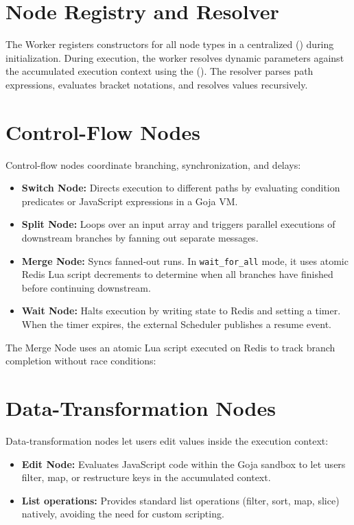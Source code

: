 \documentclass[12pt]{report}
\begin{document}
\section{Node Registry and Resolver}
The Worker registers constructors for all node types in a centralized  () during initialization. During execution, the worker resolves dynamic parameters against the accumulated execution context using the  (). The resolver parses path expressions, evaluates bracket notations, and resolves values recursively.

\section{Control-Flow Nodes}
Control-flow nodes coordinate branching, synchronization, and delays:
\begin{itemize}
    \item \textbf{Switch Node:} Directs execution to different paths by evaluating condition predicates or JavaScript expressions in a Goja VM.
    \item \textbf{Split Node:} Loops over an input array and triggers parallel executions of downstream branches by fanning out separate messages.
    \item \textbf{Merge Node:} Syncs fanned-out runs. In \texttt{wait\_for\_all} mode, it uses atomic Redis Lua script decrements to determine when all branches have finished before continuing downstream.
    \item \textbf{Wait Node:} Halts execution by writing state to Redis and setting a timer. When the timer expires, the external Scheduler publishes a resume event.
\end{itemize}

The Merge Node uses an atomic Lua script executed on Redis to track branch completion without race conditions:


\section{Data-Transformation Nodes}
Data-transformation nodes let users edit values inside the execution context:
\begin{itemize}
    \item \textbf{Edit Node:} Evaluates JavaScript code within the Goja sandbox to let users filter, map, or restructure keys in the accumulated context.
    \item \textbf{List operations:} Provides standard list operations (filter, sort, map, slice) natively, avoiding the need for custom scripting.
\end{itemize}
\end{document}
